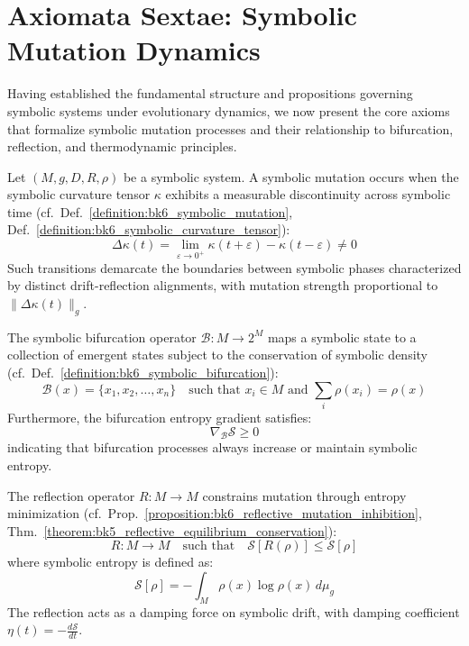 \section{Axiomata Sextae: Symbolic Mutation Dynamics}
\label{sec:bk6_axiomata_sextae_symbolic_mutation_dynamics}
Having established the fundamental structure and propositions governing symbolic systems under evolutionary dynamics, we now present the core axioms that formalize symbolic mutation processes and their relationship to bifurcation, reflection, and thermodynamic principles.
\begin{axiom}
\label{axiom:bk6_symbolic_mutation_as_curvature_transition}
Let $(M, g, D, R, \rho)$ be a symbolic system. A symbolic mutation occurs when the symbolic curvature tensor $\kappa$ exhibits a measurable discontinuity across symbolic time (cf.~Def.~\ref{definition:bk6_symbolic_mutation}, Def.~\ref{definition:bk6_symbolic_curvature_tensor}):
\begin{equation}
\Delta\kappa(t) = \lim_{\varepsilon \to 0^+} \kappa(t + \varepsilon) - \kappa(t - \varepsilon) \neq 0
\end{equation}
Such transitions demarcate the boundaries between symbolic phases characterized by distinct drift-reflection alignments, with mutation strength proportional to $\|\Delta\kappa(t)\|_g$.
\end{axiom}
\begin{axiom}
\label{axiom:bk6_bifurcation_as_emergence_operator}
The symbolic bifurcation operator $\mathcal{B}: M \to 2^M$ maps a symbolic state to a collection of emergent states subject to the conservation of symbolic density (cf.~Def.~\ref{definition:bk6_symbolic_bifurcation}):
\begin{equation}
\mathcal{B}(x) = \{x_1, x_2, \ldots, x_n\} \quad \text{such that } x_i \in M \text{ and } \sum_i \rho(x_i) = \rho(x)
\end{equation}
Furthermore, the bifurcation entropy gradient satisfies:
\begin{equation}
\nabla_{\mathcal{B}} \mathcal{S} \geq 0
\end{equation}
indicating that bifurcation processes always increase or maintain symbolic entropy.
\end{axiom}
\begin{axiom}
\label{axiom:bk6_reflective_regulation_of_mutation}
The reflection operator $R: M \to M$ constrains mutation through entropy minimization (cf.~Prop.~\ref{proposition:bk6_reflective_mutation_inhibition}, Thm.~\ref{theorem:bk5_reflective_equilibrium_conservation}):
\begin{equation}
R : M \to M \quad \text{such that} \quad \mathcal{S}[R(\rho)] \leq \mathcal{S}[\rho]
\end{equation}
where symbolic entropy is defined as:
\begin{equation}
\mathcal{S}[\rho] = -\int_M \rho(x) \log \rho(x) \, d\mu_g
\end{equation}
The reflection acts as a damping force on symbolic drift, with damping coefficient $\eta(t) = -\frac{d\mathcal{S}}{dt}$.
\end{axiom}
